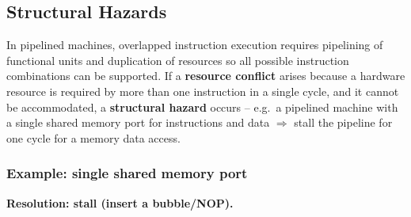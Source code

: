 \subsection{Structural Hazards}

\begin{definition}
In pipelined machines, overlapped instruction execution requires pipelining
of functional units and duplication of resources so all possible
instruction combinations can be supported. If a \textbf{resource conflict}
arises because a hardware resource is required by more than one instruction
in a single cycle, and it cannot be accommodated, a \textbf{structural
hazard} occurs -- e.g.\ a pipelined machine with a single shared memory port
for instructions and data $\Rightarrow$ stall the pipeline for one cycle for
a memory data access.
\end{definition}

\subsubsection{Example: single shared memory port}

\begin{center}
\end{center}

\textbf{Resolution: stall (insert a bubble/NOP).}

